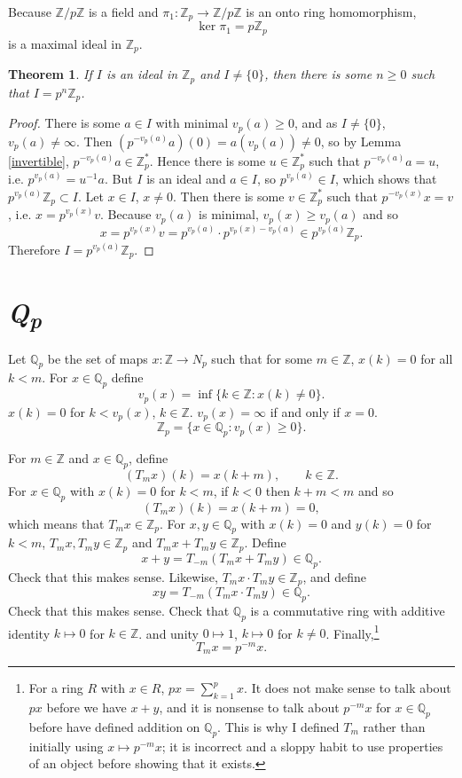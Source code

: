 \documentclass{article}
\newtheorem{theorem}{Theorem}
\theoremstyle{definition}
\begin{document}
Because $\mathbb{Z}/p\mathbb{Z}$ is a field and $\pi_1:\mathbb{Z}_p \to \mathbb{Z}/p\mathbb{Z}$ is an onto ring homomorphism,
\[
\ker \pi_1 = p\mathbb{Z}_p
\]
is a maximal ideal in $\mathbb{Z}_p$.



\begin{theorem}
If $I$ is an ideal in $\mathbb{Z}_p$ and $I \neq \{0\}$, then
there is some $n \geq 0$ such that $I=p^n \mathbb{Z}_p$.
\end{theorem}
\begin{proof}
There is some $a \in I$ with minimal $v_p(a) \geq 0$, and as $I \neq \{0\}$, $v_p(a) \neq \infty$. 
Then $(p^{-v_p(a)}a)(0) = a(v_p(a)) \neq 0$, so by Lemma \ref{invertible},
$p^{-v_p(a)} a \in \mathbb{Z}_p^*$. Hence there is some $u \in \mathbb{Z}_p^*$ such that
$p^{-v_p(a)} a = u$, i.e. $p^{v_p(a)} = u^{-1} a$. But $I$ is an ideal and $a \in I$, so
$p^{v_p(a)} \in I$, which shows that $p^{v_p(a)} \mathbb{Z}_p \subset I$. 
Let $x \in I$, $x \neq 0$.
Then there is some $v \in \mathbb{Z}_p^*$ such that $p^{-v_p(x)}x=v$, i.e.
$x = p^{v_p(x)}v$.  
Because $v_p(a)$ is minimal, $v_p(x) \geq v_p(a)$ and so
\[
x = p^{v_p(x)} v = p^{v_p(a)} \cdot p^{v_p(x)-v_p(a)} \in p^{v_p(a)} \mathbb{Z}_p.
\]
Therefore $I = p^{v_p(a)} \mathbb{Z}_p$.
\end{proof}



\section{{\em \textbf{Q}\textsubscript{p}}}
Let $\mathbb{Q}_p$ be the set of maps $x:\mathbb{Z} \to N_p$ such that for some $m \in \mathbb{Z}$, 
$x(k)=0$ for all $k<m$. For $x \in \mathbb{Q}_p$ define
\[
v_p(x) = \inf\{k \in \mathbb{Z} : x(k) \neq 0\}. 
\]
$x(k)=0$ for $k<v_p(x)$, $k \in \mathbb{Z}$. $v_p(x) = \infty$ if and only if $x=0$.
\[
\mathbb{Z}_p = \{x \in \mathbb{Q}_p: v_p(x) \geq 0\}.
\]

For $m \in \mathbb{Z}$ and $x \in \mathbb{Q}_p$, define 
\[
(T_m x)(k) = x(k+m),\qquad k \in \mathbb{Z}.
\]
For  $x \in \mathbb{Q}_p$ with $x(k)=0$ for $k<m$,
if $k<0$ then $k+m<m$ and so 
\[
(T_m x)(k) = x(k+m) = 0,
\]
which means that $T_m x \in \mathbb{Z}_p$.
For $x,y \in \mathbb{Q}_p$ with
$x(k)=0$ and $y(k)=0$ for $k<m$,
$T_m x, T_m y \in \mathbb{Z}_p$ and 
$T_m x + T_m y \in \mathbb{Z}_p$. Define
\[
x+y = T_{-m}(T_m x + T_m y) \in \mathbb{Q}_p.
\]
Check that this makes sense.
Likewise, $T_m x \cdot T_m y \in \mathbb{Z}_p$, and define
\[
xy = T_{-m} (T_m x  \cdot T_m y) \in \mathbb{Q}_p.
\]
Check that this makes sense.
Check that $\mathbb{Q}_p$ is a commutative ring with 
additive identity $k \mapsto 0$ for $k \in \mathbb{Z}$.
and unity $0 \mapsto 1$, $k \mapsto 0$ for $k \neq 0$. Finally,\footnote{For a ring $R$ with $x \in R$, $px = \sum_{k=1}^p x$. It does not make
sense to talk about $px$ before we have $x+y$, and  it is nonsense to talk about $p^{-m}x$ for $x \in \mathbb{Q}_p$ before have
defined addition on $\mathbb{Q}_p$. This is why I defined $T_m$ rather than initially using $x \mapsto p^{-m}x$; it is incorrect and a sloppy
habit to use properties of an object before showing that it exists.}
\[
T_m x = p^{-m}x.
\]
\end{document}
